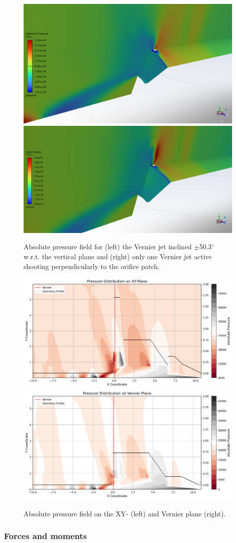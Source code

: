 \documentclass[12pt]{article}
\begin{document}
\begin{figure}[H]
    \centering
    \includegraphics[width=0.445\linewidth]{figs/t65s/t65s_V50_pabs.png}
    \includegraphics[width=0.495\linewidth]{figs/t65s/t65s_V1only_pabs.PNG}
    \caption{Absolute pressure field for (left) the Vernier jet inclined $\pm$50.3$^\circ$ w.r.t. the vertical plane and (right) only one Vernier jet active shooting perpendicularly to the orifice patch.}
    \label{fig:enter-label}
\end{figure}

\begin{figure}[H]
    \centering
    \includegraphics[width=0.495\linewidth]{figs/t65s/pressure_contour_plot_xy_plane_with_geometry.png}
    \includegraphics[width=0.495\linewidth]{figs/t65s/pressure_contour_plot_vernier_plane_with_geometry.png}
    \caption{Absolute pressure field on the XY- (left) and Vernier plane (right).}
    \label{fig:enter-label}
\end{figure}

\subsubsection*{Forces and moments}
\end{document}
